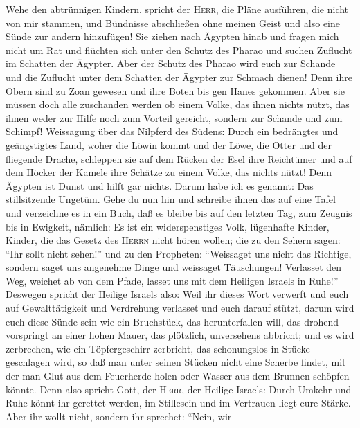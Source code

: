  Wehe den abtrünnigen Kindern, spricht der \textsc{Herr},
die Pläne ausführen, die nicht von mir stammen, und Bündnisse
abschließen ohne meinen Geist und also eine Sünde zur andern hinzufügen!
 Sie ziehen nach Ägypten hinab und fragen mich nicht um
Rat und flüchten sich unter den Schutz des Pharao und suchen Zuflucht im
Schatten der Ägypter.  Aber der Schutz des Pharao wird
euch zur Schande und die Zuflucht unter dem Schatten der Ägypter zur
Schmach dienen!  Denn ihre Obern sind zu Zoan gewesen und
ihre Boten bis gen Hanes gekommen.  Aber sie müssen doch
alle zuschanden werden ob einem Volke, das ihnen nichts nützt, das ihnen
weder zur Hilfe noch zum Vorteil gereicht, sondern zur Schande und zum
Schimpf!  Weissagung über das Nilpferd des Südens: Durch
ein bedrängtes und geängstigtes Land, woher die Löwin kommt und der
Löwe, die Otter und der fliegende Drache, schleppen sie auf dem Rücken
der Esel ihre Reichtümer und auf dem Höcker der Kamele ihre Schätze zu
einem Volke, das nichts nützt!  Denn Ägypten ist Dunst und
hilft gar nichts. Darum habe ich es genannt: Das stillsitzende Ungetüm.
 Gehe du nun hin und schreibe ihnen das auf eine Tafel und
verzeichne es in ein Buch, daß es bleibe bis auf den letzten Tag, zum
Zeugnis bis in Ewigkeit,  nämlich: Es ist ein
widerspenstiges Volk, lügenhafte Kinder, Kinder, die das Gesetz des
\textsc{Herrn} nicht hören wollen;  die zu den Sehern
sagen: ``Ihr sollt nicht sehen!'' und zu den Propheten: ``Weissaget uns
nicht das Richtige, sondern saget uns angenehme Dinge und weissaget
Täuschungen!  Verlasset den Weg, weichet ab von dem
Pfade, lasset uns mit dem Heiligen Israels in Ruhe!'' 
Deswegen spricht der Heilige Israels also: Weil ihr dieses Wort verwerft
und euch auf Gewalttätigkeit und Verdrehung verlasset und euch darauf
stützt,  darum wird euch diese Sünde sein wie ein
Bruchstück, das herunterfallen will, das drohend vorspringt an einer
hohen Mauer, das plötzlich, unversehens abbricht;  und es
wird zerbrechen, wie ein Töpfergeschirr zerbricht, das schonungslos in
Stücke geschlagen wird, so daß man unter seinen Stücken nicht eine
Scherbe findet, mit der man Glut aus dem Feuerherde holen oder Wasser
aus dem Brunnen schöpfen könnte.  Denn also spricht Gott,
der \textsc{Herr}, der Heilige Israels: Durch Umkehr und Ruhe könnt ihr
gerettet werden, im Stillesein und im Vertrauen liegt eure Stärke.
 Aber ihr wollt nicht, sondern ihr sprechet: ``Nein, wir
